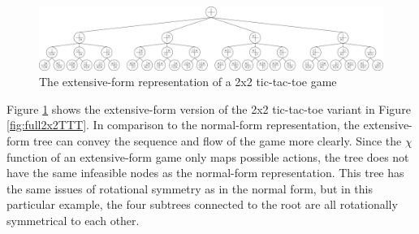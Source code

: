 \begin{figure}[H]
  \centering
  \includegraphics[width=16cm]{figures/TTTExtTree.png}
  \caption{The extensive-form representation of a 2x2 tic-tac-toe game}
  \label{fig:2x2TTTExtForm}
\end{figure}

Figure \ref{fig:2x2TTTExtForm} shows the extensive-form version of the 2x2 tic-tac-toe variant in Figure \ref{fig:full2x2TTT}. In comparison to the normal-form representation, the extensive-form tree can convey the sequence and flow of the game more clearly. Since the $\chi$ function of an extensive-form game only maps possible actions, the tree does not have the same infeasible nodes as the normal-form representation. This tree has the same issues of rotational symmetry as in the normal form, but in this particular example, the four subtrees connected to the root are all rotationally symmetrical to each other.

